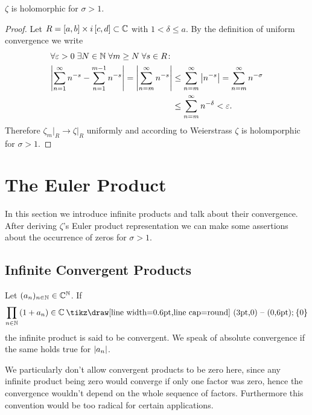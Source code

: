 \begin{theorem}
	$\zeta$ is holomorphic for $\sigma > 1$.
\end{theorem}
\begin{proof}
	Let $R = \left[a, b\right] \times i\left[c, d\right] \subset \mathbb{C}$ with $1 < \delta \leq a$. By the definition of uniform convergence we write
\begin{equation*}
\begin{aligned}
	&\forall \varepsilon > 0 \; \exists N \in \mathbb{N} \; \forall m \geq N \; \forall s \in R \colon \\
	&\begin{aligned}
	\left|\sum _{n = 1} ^\infty n^{-s} - \sum _{n = 1} ^{m - 1} n^{-s}\right|
	= \left|\sum _{n = m} ^\infty n^{-s}\right|
	&\leq \sum _{n = m} ^\infty \left|n^{-s}\right|
	= \sum _{n = m} ^\infty n^{-\sigma} \\
	&\leq \sum _{n = m} ^\infty n^{-\delta} < \varepsilon.
	\end{aligned}
\end{aligned}
\end{equation*}
	Therefore $\zeta_m \big\vert _R \to \zeta \big\vert _R$ uniformly and according to Weierstrass $\zeta$ is holomporphic for $\sigma > 1$.
\end{proof}


\section{The Euler Product}
In this section we introduce infinite products and talk about their convergence. After deriving $\zeta$'s Euler product representation we can make some assertions about the occurrence of zeros for $\sigma > 1$.


\subsection{Infinite Convergent Products}


\begin{definition}
	Let $(a_n)_{n \in \mathbb{N}} \in \mathbb{C}^{\mathbb{N}}$. If
\begin{equation*}
	\prod_{n \in \field{N}} \cbr{1 + a_n} \in \field{C} \mysetminus \fbr{0}
\end{equation*}
	the infinite product is said to be convergent. We speak of absolute convergence if the same holds true for $\left|a_n\right|$.
\end{definition}


\begin{remark}
	We particularly don't allow convergent products to be zero here, since any infinite product being zero would converge if only one factor was zero, hence the convergence wouldn't depend on the whole sequence of factors. Furthermore this convention would be too radical for certain applications.
\end{remark}


